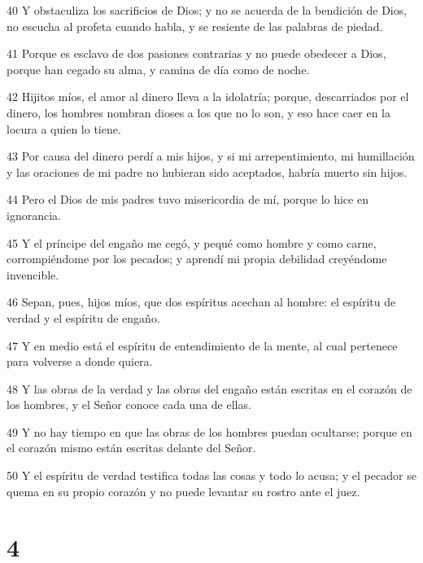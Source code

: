 \par 40 Y obstaculiza los sacrificios de Dios; y no se acuerda de la bendición de Dios, no escucha al profeta cuando habla, y se resiente de las palabras de piedad.

\par 41 Porque es esclavo de dos pasiones contrarias y no puede obedecer a Dios, porque han cegado su alma, y ​​camina de día como de noche.

\par 42 Hijitos míos, el amor al dinero lleva a la idolatría; porque, descarriados por el dinero, los hombres nombran dioses a los que no lo son, y eso hace caer en la locura a quien lo tiene.

\par 43 Por causa del dinero perdí a mis hijos, y si mi arrepentimiento, mi humillación y las oraciones de mi padre no hubieran sido aceptados, habría muerto sin hijos.

\par 44 Pero el Dios de mis padres tuvo misericordia de mí, porque lo hice en ignorancia.

\par 45 Y el príncipe del engaño me cegó, y pequé como hombre y como carne, corrompiéndome por los pecados; y aprendí mi propia debilidad creyéndome invencible.

\par 46 Sepan, pues, hijos míos, que dos espíritus acechan al hombre: el espíritu de verdad y el espíritu de engaño.

\par 47 Y en medio está el espíritu de entendimiento de la mente, al cual pertenece para volverse a donde quiera.

\par 48 Y las obras de la verdad y las obras del engaño están escritas en el corazón de los hombres, y el Señor conoce cada una de ellas.

\par 49 Y no hay tiempo en que las obras de los hombres puedan ocultarse; porque en el corazón mismo están escritas delante del Señor.

\par 50 Y el espíritu de verdad testifica todas las cosas y todo lo acusa; y el pecador se quema en su propio corazón y no puede levantar su rostro ante el juez.

\chapter{4}

